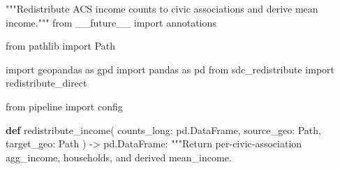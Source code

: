 \documentclass[
  letterpaper,
  DIV=11,
  numbers=noendperiod]{scrreprt}
\newenvironment{Shaded}{\begin{snugshade}}{\end{snugshade}}
\newcommand{\CommentTok}[1]{\textcolor[rgb]{0.37,0.37,0.37}{#1}}
\newcommand{\ImportTok}[1]{\textcolor[rgb]{0.00,0.46,0.62}{#1}}
\newcommand{\KeywordTok}[1]{\textcolor[rgb]{0.00,0.23,0.31}{\textbf{#1}}}
\newcommand{\NormalTok}[1]{\textcolor[rgb]{0.00,0.23,0.31}{#1}}
\newcommand{\OperatorTok}[1]{\textcolor[rgb]{0.37,0.37,0.37}{#1}}
\begin{document}
\begin{Shaded}
\begin{Highlighting}[]
\CommentTok{"""Redistribute ACS income counts to civic associations and derive mean income."""}
\ImportTok{from}\NormalTok{ \_\_future\_\_ }\ImportTok{import}\NormalTok{ annotations}

\ImportTok{from}\NormalTok{ pathlib }\ImportTok{import}\NormalTok{ Path}

\ImportTok{import}\NormalTok{ geopandas }\ImportTok{as}\NormalTok{ gpd}
\ImportTok{import}\NormalTok{ pandas }\ImportTok{as}\NormalTok{ pd}
\ImportTok{from}\NormalTok{ sdc\_redistribute }\ImportTok{import}\NormalTok{ redistribute\_direct}

\ImportTok{from}\NormalTok{ pipeline }\ImportTok{import}\NormalTok{ config}


\KeywordTok{def}\NormalTok{ redistribute\_income(}
\NormalTok{    counts\_long: pd.DataFrame, source\_geo: Path, target\_geo: Path}
\NormalTok{) }\OperatorTok{{-}\textgreater{}}\NormalTok{ pd.DataFrame:}
    \CommentTok{"""Return per{-}civic{-}association agg\_income, households, and derived mean\_income.}


\end{Highlighting}
\end{Shaded}
\end{document}
